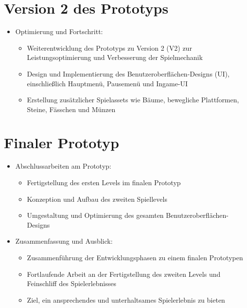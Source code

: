 \pagebreak

\section{Version 2 des Prototyps}

\begin{itemize}
  \item Optimierung und Fortschritt:
    \begin{itemize}
      \item Weiterentwicklung des Prototyps zu Version 2 (V2) zur Leistungsoptimierung und Verbesserung der Spielmechanik
      \item Design und Implementierung des Benutzeroberflächen-Designs (UI), einschließlich Hauptmenü, Pausemenü und Ingame-UI
      \item Erstellung zusätzlicher Spielassets wie Bäume, bewegliche Plattformen, Steine, Fässchen und Münzen
    \end{itemize}
\end{itemize}

\pagebreak

\section{Finaler Prototyp}

\begin{itemize}
  \item Abschlussarbeiten am Prototyp:
    \begin{itemize}
      \item Fertigstellung des ersten Levels im finalen Prototyp
      \item Konzeption und Aufbau des zweiten Spiellevels
      \item Umgestaltung und Optimierung des gesamten Benutzeroberflächen-Designs
    \end{itemize}
    
  \item Zusammenfassung und Ausblick:
    \begin{itemize}
      \item Zusammenführung der Entwicklungsphasen zu einem finalen Prototypen
      \item Fortlaufende Arbeit an der Fertigstellung des zweiten Levels und Feinschliff des Spielerlebnisses
      \item Ziel, ein ansprechendes und unterhaltsames Spielerlebnis zu bieten
    \end{itemize}
\end{itemize}



\pagebreak

